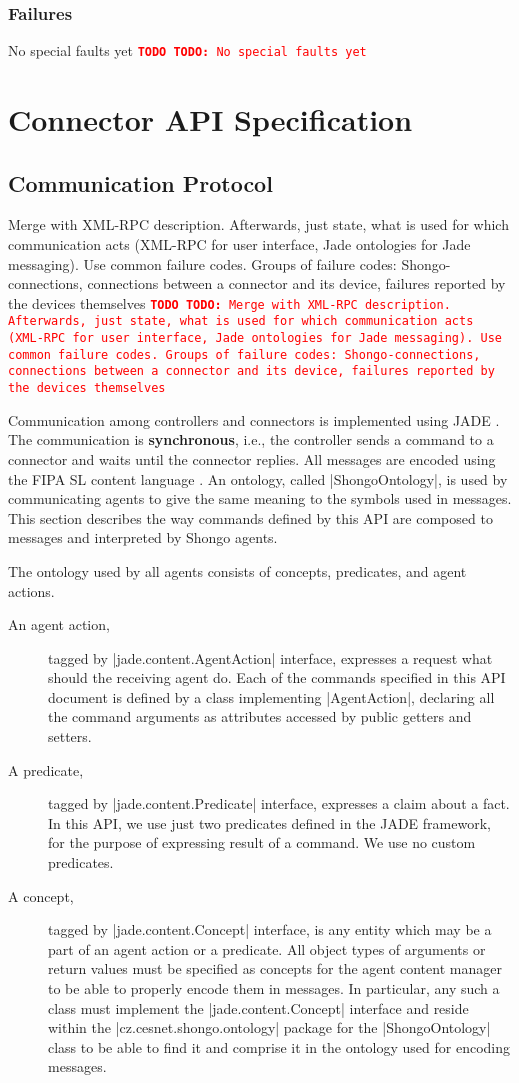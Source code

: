 \documentclass[a4paper]{report}
\newcommand{\ApiCode}[1]{\lstinline[style=styleApi]|#1|}
\newcommand{\ApiItem}[1]{\item #1 %

}
\newenvironment{ApiFailures}{\begin{compactitem}}{\end{compactitem}}
\newcommand{\ApiFailure}[1]{\ApiItem{\ApiCode{faultCode = #1}}}
\newcommand{\TODO}[1]{%
\def\empty{}%
\def\prvniparametr{#1}%
\ifx\prvniparametr\empty%
\begingroup\tt\textcolor{red}{\noindent\textbf{TODO}}\endgroup
\else%
\begingroup\tt\textcolor{red}{\noindent\textbf{TODO:}\ #1}\endgroup
\fi%
}
\begin{document}
\subsection{Failures}

\TODO{No special faults yet}


\chapter{Connector API Specification}

\section{Communication Protocol}

\TODO{Merge with XML-RPC description. Afterwards, just state, what is used for which communication acts (XML-RPC for user interface, Jade ontologies for Jade messaging). Use common failure codes. Groups of failure codes: Shongo-connections, connections between a connector and its device, failures reported by the devices themselves}

Communication among controllers and connectors is implemented using JADE \cite{jade}. The communication is \textbf{synchronous}, i.e., the controller sends a command to a connector and waits until the connector replies. All messages are encoded using the FIPA SL content language \cite{FIPA-SL}. An ontology, called |ShongoOntology|, is used by communicating agents to give the same meaning to the symbols used in messages. This section describes the way commands defined by this API are composed to messages and interpreted by Shongo agents.

The ontology used by all agents consists of concepts, predicates, and agent actions.
\begin{description}
\item[An agent action,] tagged by |jade.content.AgentAction| interface, expresses a request what should the receiving agent do. Each of the commands specified in this API document is defined by a class implementing |AgentAction|, declaring all the command arguments as attributes accessed by public getters and setters.
\item[A predicate,] tagged by |jade.content.Predicate| interface, expresses a claim about a fact. In this API, we use just two predicates defined in the JADE framework, for the purpose of expressing result of a command. We use no custom predicates.
\item[A concept,] tagged by |jade.content.Concept| interface, is any entity which may be a part of an agent action or a predicate. All object types of arguments or return values must be specified as concepts for the agent content manager to be able to properly encode them in messages. In particular, any such a class must implement the |jade.content.Concept| interface and reside within the |cz.cesnet.shongo.ontology| package for the |ShongoOntology| class to be able to find it and comprise it in the ontology used for encoding messages.
\end{description}
\end{document}
